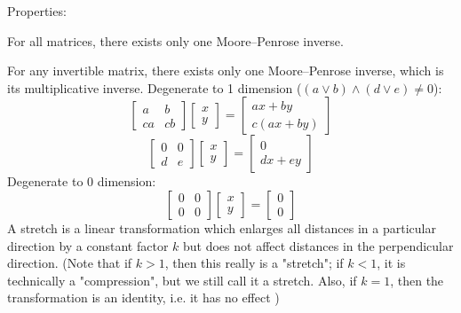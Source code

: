 \documentclass[a4paper,12pt]{report}
\begin{document}
Properties:
\bit
\item For all matrices, there exists only one Moore–Penrose inverse.
\item For any invertible matrix, there exists only one Moore–Penrose inverse, which is its multiplicative inverse.
\eit
{}
Degenerate to 1 dimension ($(a\lor b)\land (d\lor e)\neq 0$):
\[\begin{bmatrix}a & b\\ca & cb\end{bmatrix}\begin{bmatrix}x \\ y\end{bmatrix}=\begin{bmatrix}ax+by \\ c(ax+by)\end{bmatrix}\]
\[\begin{bmatrix}0 & 0\\d & e\end{bmatrix}\begin{bmatrix}x \\ y\end{bmatrix}=\begin{bmatrix}0 \\ dx+ey\end{bmatrix}\]
Degenerate to 0 dimension:
\[\begin{bmatrix}0 & 0\\0 & 0\end{bmatrix}\begin{bmatrix}x \\ y\end{bmatrix}=\begin{bmatrix}0 \\ 0\end{bmatrix}\]
A stretch is a linear transformation which enlarges all distances in a particular direction by a constant factor $k$ but does not affect distances in the perpendicular direction. (Note that if $k > 1$, then this really is a "stretch"; if $k < 1$, it is technically a "compression", but we still call it a stretch. Also, if $k = 1$, then the transformation is an identity, i.e. it has no effect
)
\end{document}
